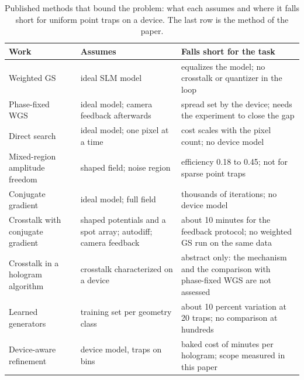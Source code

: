 \begin{table}[t]
\centering\small
\caption{Published methods that bound the problem: what each assumes and where it falls short for uniform point traps on a device. The last row is the method of the paper.}
\label{tab:related}
\begin{tabular}{@{}p{3.6cm} p{4.2cm} p{6.2cm}@{}}
\toprule
Work & Assumes & Falls short for the task\\
\midrule
Weighted GS~\cite{dileonardo} & ideal SLM model & equalizes the model; no crosstalk or quantizer in the loop\\
Phase-fixed WGS~\cite{kim2019} & ideal model; camera feedback afterwards & spread set by the device; needs the experiment to close the gap\\
Direct search~\cite{polin} & ideal model; one pixel at a time & cost scales with the pixel count; no device model\\
Mixed-region amplitude freedom~\cite{pasienski} & shaped field; noise region & efficiency 0.18 to 0.45; not for sparse point traps\\
Conjugate gradient~\cite{harte} & ideal model; full field & thousands of iterations; no device model\\
Crosstalk with conjugate gradient~\cite{schroff} & shaped potentials and a spot array; autodiff; camera feedback & about 10 minutes for the feedback protocol; no weighted GS run on the same data\\
Crosstalk in a hologram algorithm~\cite{persson} & crosstalk characterized on a device & abstract only: the mechanism and the comparison with phase-fixed WGS are not assessed\\
Learned generators~\cite{ren,eybposh} & training set per geometry class & about 10 percent variation at 20 traps; no comparison at hundreds\\
Device-aware refinement & device model, traps on bins & baked cost of minutes per hologram; scope measured in this paper\\
\bottomrule
\end{tabular}
\end{table}
